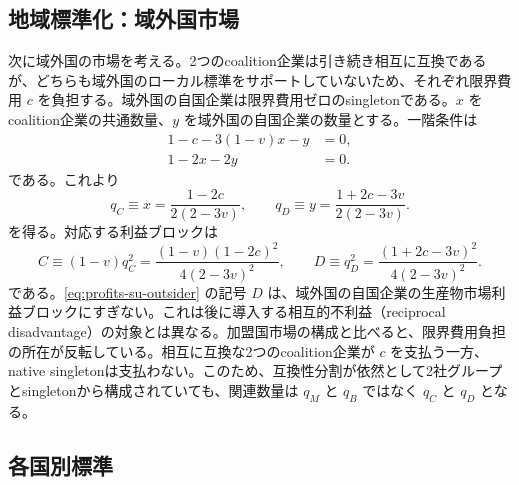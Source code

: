 \subsection{地域標準化：域外国市場}
\label{subsec:product-market-su-outsider}

次に域外国の市場を考える。2つのcoalition企業は引き続き相互に互換であるが、どちらも域外国のローカル標準をサポートしていないため、それぞれ限界費用 $c$ を負担する。域外国の自国企業は限界費用ゼロのsingletonである。$x$ をcoalition企業の共通数量、$y$ を域外国の自国企業の数量とする。一階条件は
\begin{align}
    1-c-3(1-v)x-y&=0, \label{eq:foc-su-outsider-compatible}\\
    1-2x-2y&=0. \label{eq:foc-su-outsider-native}
\end{align}
である。これより
\begin{equation}
    q_C\equiv x=\frac{1-2c}{2(2-3v)},
    \qquad
    q_D\equiv y=\frac{1+2c-3v}{2(2-3v)}.
    \label{eq:quantities-su-outsider}
\end{equation}
を得る。対応する利益ブロックは
\begin{equation}
    C\equiv(1-v)q_C^2
    =\frac{(1-v)(1-2c)^2}{4(2-3v)^2},
    \qquad
    D\equiv q_D^2
    =\frac{(1+2c-3v)^2}{4(2-3v)^2}.
    \label{eq:profits-su-outsider}
\end{equation}
である。\eqref{eq:profits-su-outsider} の記号 $D$ は、域外国の自国企業の生産物市場利益ブロックにすぎない。これは後に導入する相互的不利益（reciprocal disadvantage）の対象とは異なる。加盟国市場の構成と比べると、限界費用負担の所在が反転している。相互に互換な2つのcoalition企業が $c$ を支払う一方、native singletonは支払わない。このため、互換性分割が依然として2社グループとsingletonから構成されていても、関連数量は $q_M$ と $q_B$ ではなく $q_C$ と $q_D$ となる。

\subsection{各国別標準}
\label{subsec:product-market-sw}

